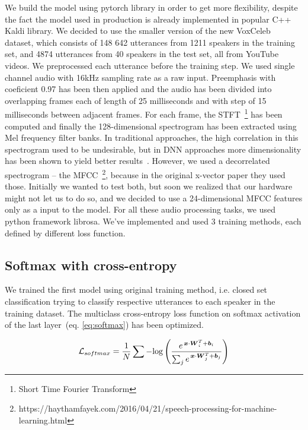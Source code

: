 We build the model using pytorch library in order to get more flexibility, despite the fact the model used in production is already implemented in popular C++ Kaldi library. We decided to use the smaller version of the new VoxCeleb~\cite{VoxCeleb} dataset, which consists of 148 642 utterances from 1211 speakers in the training set, and 4874 utterances from 40 speakers in the test set, all from YouTube videos. We preprocessed each utterance before the training step. We used single channel audio with 16kHz sampling rate as a raw input. Preemphasis with coeficient 0.97 has been then applied and the audio has been divided into overlapping frames each of length of 25 milliseconds and with step of 15 milliseconds between adjacent frames. For each frame, the STFT~\footnote{Short Time Fourier Transform} has been computed and finally the 128-dimensional spectrogram has been extracted using Mel frequency filter banks. In traditional approaches, the high correlation in this spectrogram used to be undesirable, but in DNN approaches more dimensionality has been shown to yield better results~\cite{CNN_2016}. However, we used a decorrelated spectrogram -- the MFCC~\footnote{https://haythamfayek.com/2016/04/21/speech-processing-for-machine-learning.html}, because in the original x-vector paper they used those. Initially we wanted to test both, but soon we realized that our hardware might not let us to do so, and we decided to use a 24-dimensional MFCC features only as a input to the model. For all these audio processing tasks, we used python framework librosa. We've implemented and used 3 training methods, each defined by different loss function.

\subsection*{Softmax with cross-entropy}

We trained the first model using original training method, i.e. closed set classification trying to classify respective utterances to each speaker in the training dataset. The multiclass cross-entropy loss function on softmax activation of the last layer~(eq. \ref{eq:softmax}) has been optimized.

\begin{equation} \label{eq:softmax}
\mathcal{L}_{softmax} = \frac{1}{N} \sum - \textnormal{log} \left( 
\frac{e^{\,\boldsymbol{x} \cdot \boldsymbol{W}_i^T + \boldsymbol{b}_i}}
{\sum_{j} e^{\,\boldsymbol{x} \cdot \boldsymbol{W}_j^T + \boldsymbol{b}_j}} 
\right)
\end{equation}

